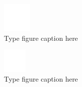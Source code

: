 \documentclass{article}
\begin{document}
\begin{figure}[h!]
 \begin{center}
  \includegraphics[max width=\textwidth]{calculations/831.png}
  \caption{Type figure caption here}
  \label{fig:831}
 \end{center}
\end{figure}
\begin{figure}[h!]
 \begin{center}
  \includegraphics[max width=\textwidth]{calculations/832.png}
  \caption{Type figure caption here}
  \label{fig:832}
 \end{center}
\end{figure}
\end{document}
